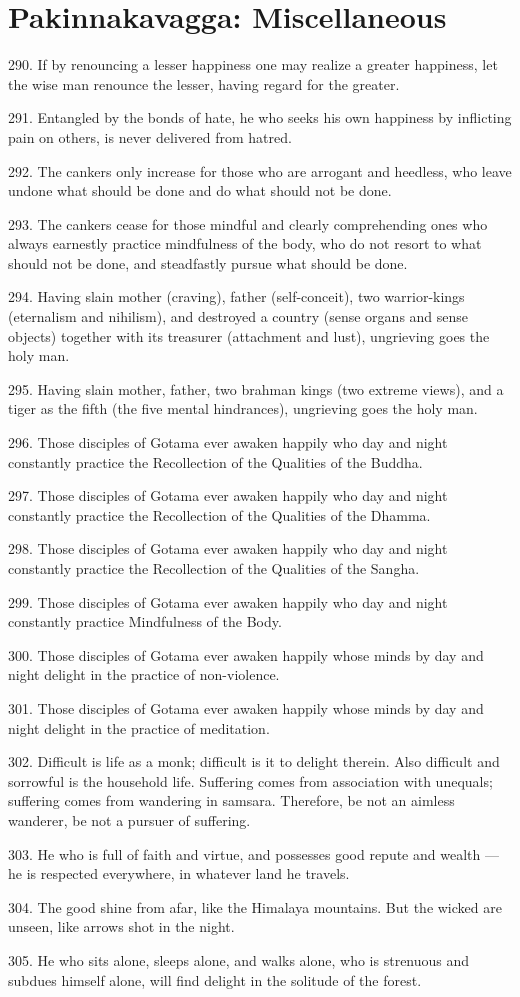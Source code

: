 \newpage
\chapter{Pakinnakavagga: Miscellaneous}
290. If by renouncing a lesser happiness one may realize a greater happiness, let the wise man renounce the lesser, having regard for the greater.

291. Entangled by the bonds of hate, he who seeks his own happiness by inflicting pain on others, is never delivered from hatred.

292. The cankers only increase for those who are arrogant and heedless, who leave undone what should be done and do what should not be done.

293. The cankers cease for those mindful and clearly comprehending ones who always earnestly practice mindfulness of the body, who do not resort to what should not be done, and steadfastly pursue what should be done.

294. Having slain mother (craving), father (self-conceit), two warrior-kings (eternalism and nihilism), and destroyed a country (sense organs and sense objects) together with its treasurer (attachment and lust), ungrieving goes the holy man.

295. Having slain mother, father, two brahman kings (two extreme views), and a tiger as the fifth (the five mental hindrances), ungrieving goes the holy man.

296. Those disciples of Gotama ever awaken happily who day and night constantly practice the Recollection of the Qualities of the Buddha.

297. Those disciples of Gotama ever awaken happily who day and night constantly practice the Recollection of the Qualities of the Dhamma.

298. Those disciples of Gotama ever awaken happily who day and night constantly practice the Recollection of the Qualities of the Sangha.

299. Those disciples of Gotama ever awaken happily who day and night constantly practice Mindfulness of the Body.

300. Those disciples of Gotama ever awaken happily whose minds by day and night delight in the practice of non-violence.

301. Those disciples of Gotama ever awaken happily whose minds by day and night delight in the practice of meditation.

302. Difficult is life as a monk; difficult is it to delight therein. Also difficult and sorrowful is the household life. Suffering comes from association with unequals; suffering comes from wandering in samsara. Therefore, be not an aimless wanderer, be not a pursuer of suffering.

303. He who is full of faith and virtue, and possesses good repute and wealth — he is respected everywhere, in whatever land he travels.

304. The good shine from afar, like the Himalaya mountains. But the wicked are unseen, like arrows shot in the night.

305. He who sits alone, sleeps alone, and walks alone, who is strenuous and subdues himself alone, will find delight in the solitude of the forest.
